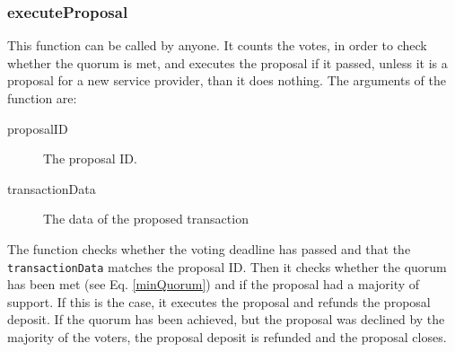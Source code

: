 \documentclass[9pt,oneside]{amsart}
\begin{document}
\begin{multicols}{2}
\subsubsection*{executeProposal}
This function can be called by anyone. It counts the votes, in order to check whether the quorum is met, and executes the proposal if it passed, unless it is a proposal for a new service provider, than it does nothing.
The arguments of the function are:
\begin{description}
 \item[proposalID] The proposal ID.
 \item[transactionData] The data of the proposed transaction
\end{description}
The function checks whether the voting deadline has passed and that the \verb|transactionData| matches the proposal ID. Then it checks whether the quorum has been met (see Eq. \ref{minQuorum}) and if the proposal had a majority of support. If this is the case, it executes the proposal and refunds the 
proposal deposit. If the quorum has been achieved, but the proposal was declined by the majority of the voters, the proposal deposit is refunded and the proposal closes.


\end{multicols}
\end{document}
